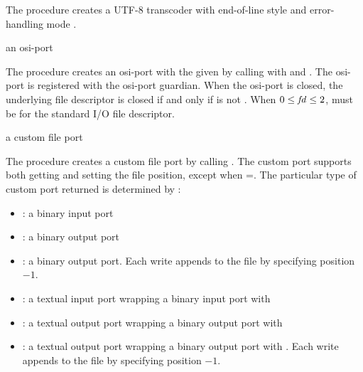The  procedure creates a UTF-8 transcoder
with end-of-line style  and error-handling mode
.

\begin{procedure}
\end{procedure}
\returns{} an osi-port

The  procedure creates an osi-port with the given
 by calling  with  and
. The osi-port is registered with the osi-port
guardian. When the osi-port is closed, the
underlying file descriptor  is closed if and only if
 is not . When $0 \le \var{fd} \le 2$,
 must be  for the standard I/O file descriptor.

\begin{procedure}
\end{procedure}
\returns{} a custom file port

The  procedure creates a custom file port by calling
. The custom
port supports both getting and setting the file position, except when
=. The particular type of custom port returned
is determined by :
\begin{itemize}
  \item {}: a binary input port
  \item {}: a binary output port
  \item {}: a binary output port.
    Each write appends to the file by specifying position $-1$.
  \item {}: a textual input port wrapping a binary input
    port with 
  \item {}: a textual output port wrapping a binary
    output port with 
  \item {}: a textual output port wrapping a binary output
    port with . Each write appends to the file by
    specifying position $-1$.
\end{itemize}

